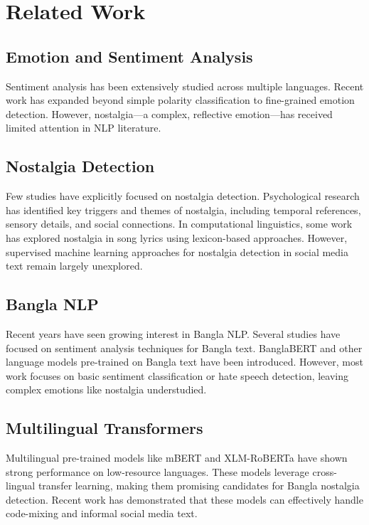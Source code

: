 \documentclass[conference]{IEEEtran}
\begin{document}
\section{Related Work}
\label{sec:related-work}

\subsection{Emotion and Sentiment Analysis}

Sentiment analysis has been extensively studied across multiple languages. Recent work has expanded beyond simple polarity classification to fine-grained emotion detection. However, nostalgia—a complex, reflective emotion—has received limited attention in NLP literature.

\subsection{Nostalgia Detection}

Few studies have explicitly focused on nostalgia detection. Psychological research has identified key triggers and themes of nostalgia, including temporal references, sensory details, and social connections. In computational linguistics, some work has explored nostalgia in song lyrics using lexicon-based approaches. However, supervised machine learning approaches for nostalgia detection in social media text remain largely unexplored.

\subsection{Bangla NLP}

Recent years have seen growing interest in Bangla NLP. Several studies have focused on sentiment analysis techniques for Bangla text. BanglaBERT and other language models pre-trained on Bangla text have been introduced. However, most work focuses on basic sentiment classification or hate speech detection, leaving complex emotions like nostalgia understudied.

\subsection{Multilingual Transformers}

Multilingual pre-trained models like mBERT and XLM-RoBERTa have shown strong performance on low-resource languages. These models leverage cross-lingual transfer learning, making them promising candidates for Bangla nostalgia detection. Recent work has demonstrated that these models can effectively handle code-mixing and informal social media text.
\end{document}
